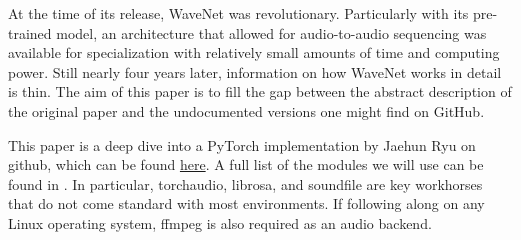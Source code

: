 At the time of its release, WaveNet was revolutionary. Particularly with its pre-trained model, an architecture that allowed for audio-to-audio sequencing was available for specialization with relatively small amounts of time and computing power. Still nearly four years later, information on how WaveNet works in detail is thin. The aim of this paper is to fill the gap between the abstract description of the original paper and the undocumented versions one might find on GitHub.

This paper is a deep dive into a PyTorch implementation by Jaehun Ryu on github, which can be found \href{https://github.com/ryujaehun/wavenet}{here}. A full list of the modules we will use can be found in . In particular, torchaudio, librosa, and soundfile are key workhorses that do not come standard with most environments. If following along on any Linux operating system, ffmpeg is also required as an audio backend. 